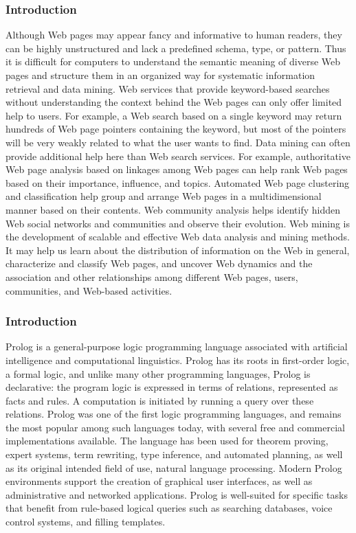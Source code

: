 \documentclass{beamer}
\begin{document}
\begin{frame}
    \frametitle{Introduction}
    \begin{minipage}{\textwidth}        
        Although Web pages may appear fancy and informative to human readers, they can be
        highly unstructured and lack a predefined schema, type, or pattern. Thus it is difficult for
        computers to understand the semantic meaning of diverse Web pages and structure them
        in an organized way for systematic information retrieval and data mining. Web services
        that provide keyword-based searches without understanding the context behind the Web
        pages can only offer limited help to users. For example, a Web search based on a single
        keyword may return hundreds of Web page pointers containing the keyword, but most
        of the pointers will be very weakly related to what the user wants to find. Data mining
        can often provide additional help here than Web search services. For example, authoritative
        Web page analysis based on linkages among Web pages can help rank Web pages based on their importance, influence, and topics. Automated Web page clustering and
        classification help group and arrange Web pages in a multidimensional manner based
        on their contents. Web community analysis helps identify hidden Web social networks
        and communities and observe their evolution. Web mining is the development of scalable
        and effective Web data analysis and mining methods. It may help us learn about the
        distribution of information on the Web in general, characterize and classify Web pages,
        and uncover Web dynamics and the association and other relationships among different
        Web pages, users, communities, and Web-based activities.
    \end{minipage}
\end{frame}


\begin{frame}
    \frametitle{Introduction}
    \begin{minipage}{\textwidth}
        Prolog is a general-purpose logic programming language associated with artificial intelligence and computational linguistics.
        Prolog has its roots in first-order logic, a formal logic, and unlike many other programming languages, Prolog is declarative: the program logic is expressed in terms of relations, represented as facts and rules. A computation is initiated by running a query over these relations.
        Prolog was one of the first logic programming languages, and remains the most popular among such languages today, with several free and commercial implementations available. The language has been used for theorem proving, expert systems, term rewriting, type inference, and automated planning, as well as its original intended field of use, natural language processing. Modern Prolog environments support the creation of graphical user interfaces, as well as administrative and networked applications.
        Prolog is well-suited for specific tasks that benefit from rule-based logical queries such as searching databases, voice control systems, and filling templates.
    \end{minipage}
\end{frame}
\end{document}
